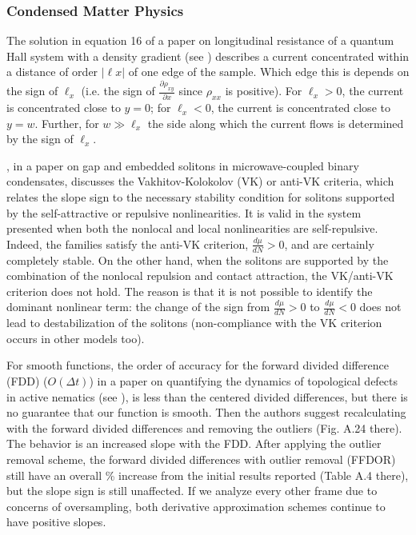 \documentclass[11pt]{book}
\begin{document}

\subsubsection{Condensed Matter Physics}

The solution in equation 16 of a paper on longitudinal resistance of a quantum Hall system
with a density gradient (see \cite{ilan2006longitudinal}) describes
a current concentrated within a distance of order $\left|\ell x\right|$
of one edge of the sample. Which edge this is depends on the sign
of $\ell_{x}$ (i.e. the sign of $\frac{\partial\rho_{xy}}{\partial x}$
since $\rho_{xx}$ is positive). For $\ell_{x}>0$, the current is
concentrated close to $y=0$; for $\ell_{x}<0$, the current is concentrated
close to $y=w$. Further, for $w\gg\ell_{x}$ the side along which
the current flows is determined by the sign of $\ell_{x}$.

\cite{fan2020gap}, in a paper on gap and embedded solitons in microwave-coupled binary condensates,  discusses the Vakhitov-Kolokolov (VK) or anti-VK
criteria, which relates the slope sign to the necessary stability
condition for solitons supported by the self-attractive or repulsive
nonlinearities. It is valid in the system presented when both the
nonlocal and local nonlinearities are self-repulsive. Indeed, the
families satisfy the anti-VK criterion, $\frac{d\mu}{dN}>0$, and
are certainly completely stable. On the other hand, when the solitons
are supported by the combination of the nonlocal repulsion and contact
attraction, the VK/anti-VK criterion does not hold. The reason is
that it is not possible to identify the dominant nonlinear term: the
change of the sign from $\frac{d\mu}{dN}>0$ to $\frac{d\mu}{dN}<0$
does not lead to destabilization of the solitons (non-compliance with
the VK criterion occurs in other models too).

For smooth functions, the order of accuracy for the forward divided difference (FDD) ($O\left(\Delta t\right)$)
in a paper on quantifying the dynamics of topological defects in active nematics (see \cite{morgan2020quantifying}), is less than the centered divided
differences, but there is no guarantee that our function is smooth.
Then the authors suggest recalculating with the forward divided differences
and removing the outliers (Fig. A.24 there). The behavior is an increased
slope with the FDD. After applying the outlier removal scheme, the
forward divided differences with outlier removal (FFDOR) still have
an overall \% increase from the initial results reported (Table A.4
there), but the slope sign is still unaffected. If we analyze every
other frame due to concerns of oversampling, both derivative approximation
schemes continue to have positive slopes.
\end{document}
